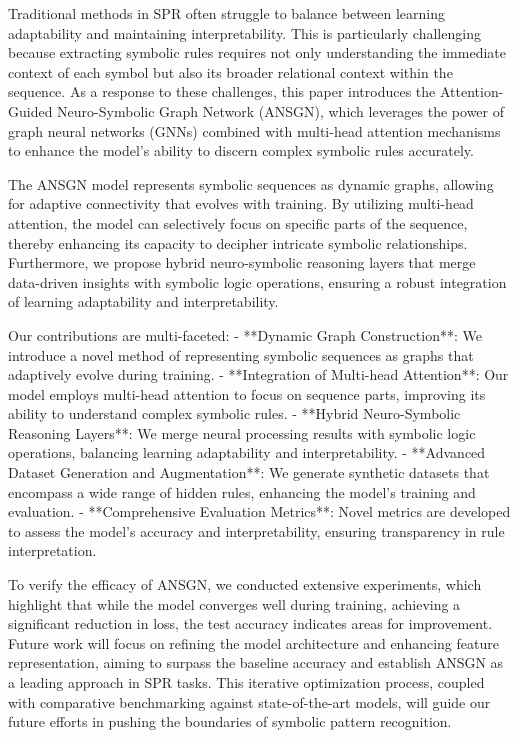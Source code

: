 \documentclass{article}
\begin{document}
Traditional methods in SPR often struggle to balance between learning adaptability and maintaining interpretability. This is particularly challenging because extracting symbolic rules requires not only understanding the immediate context of each symbol but also its broader relational context within the sequence. As a response to these challenges, this paper introduces the Attention-Guided Neuro-Symbolic Graph Network (ANSGN), which leverages the power of graph neural networks (GNNs) combined with multi-head attention mechanisms to enhance the model's ability to discern complex symbolic rules accurately.

The ANSGN model represents symbolic sequences as dynamic graphs, allowing for adaptive connectivity that evolves with training. By utilizing multi-head attention, the model can selectively focus on specific parts of the sequence, thereby enhancing its capacity to decipher intricate symbolic relationships. Furthermore, we propose hybrid neuro-symbolic reasoning layers that merge data-driven insights with symbolic logic operations, ensuring a robust integration of learning adaptability and interpretability.

Our contributions are multi-faceted:
- **Dynamic Graph Construction**: We introduce a novel method of representing symbolic sequences as graphs that adaptively evolve during training.
- **Integration of Multi-head Attention**: Our model employs multi-head attention to focus on sequence parts, improving its ability to understand complex symbolic rules.
- **Hybrid Neuro-Symbolic Reasoning Layers**: We merge neural processing results with symbolic logic operations, balancing learning adaptability and interpretability.
- **Advanced Dataset Generation and Augmentation**: We generate synthetic datasets that encompass a wide range of hidden rules, enhancing the model's training and evaluation.
- **Comprehensive Evaluation Metrics**: Novel metrics are developed to assess the model's accuracy and interpretability, ensuring transparency in rule interpretation.

To verify the efficacy of ANSGN, we conducted extensive experiments, which highlight that while the model converges well during training, achieving a significant reduction in loss, the test accuracy indicates areas for improvement. Future work will focus on refining the model architecture and enhancing feature representation, aiming to surpass the baseline accuracy and establish ANSGN as a leading approach in SPR tasks. This iterative optimization process, coupled with comparative benchmarking against state-of-the-art models, will guide our future efforts in pushing the boundaries of symbolic pattern recognition.
\end{document}
